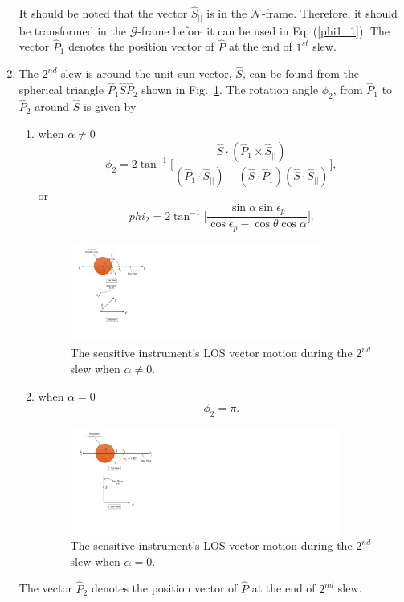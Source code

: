 \documentclass[journal ]{new-aiaa}
\begin{document}
\begin{enumerate}
		It should be noted that the vector $\hat{S}_{||}$ is in the $\mathcal{N}$-frame. Therefore, it should be transformed in the $\mathcal{G}$-frame before it can be used in Eq. (\ref{phi1_1}). The vector $\hat{P}_1$ denotes the position vector of $\hat{P}$ at the end of $1^{st}$ slew.
		\item The $2^{nd}$ slew is around the unit sun vector, $\hat{S}$, can be found from the spherical triangle $\hat{P}_1\hat{S}\hat{P}_2$ shown in Fig.~\ref{sphericaltriangle}. The rotation angle $\phi_2$, from $\hat{P}_1$ to $\hat{P}_2$ around $\hat{S}$ is given by\cite{Wertz2011} 
		\begin{enumerate}
			\item when $\alpha\neq 0$
	\begin{equation}
	\phi_2=2\tan^{-1}\Big[ \frac{\hat{S}\cdot (\hat{P}_1\times\hat{S}_{||})}{(\hat{P}_1\cdot\hat{S}_{||})-(\hat{S}\cdot\hat{P}_1)(\hat{S}\cdot\hat{S}_{||})}\Big], 
	\end{equation}
or
	\begin{equation} 
	phi_2=2\tan^{-1}\Big[ \frac{\sin\alpha \sin\epsilon_p}{\cos\epsilon_p-\cos\theta\cos\alpha}\Big].
	\end{equation}
			\begin{figure}[h!]
				\centering
					\includegraphics[width=3.25in]{./Figures/SVAS_2r_modified}
					\caption{The sensitive instrument's LOS vector motion during the $2^{nd}$ slew when $\alpha\neq 0$.}
					\label{sphericaltriangle}
			\end{figure}			
			\item when $\alpha=0$
			\begin{equation}
				\phi_2 = \pi.
			\end{equation}
			\begin{figure}[h!]
				\centering
					\includegraphics[width=3.5in]{./Figures/SVAS_3r_modified}
						\caption{The sensitive instrument's LOS vector motion during the $2^{nd}$ slew when $\alpha= 0$.}
			\end{figure}
		\end{enumerate}
		The vector $\hat{P}_2$ denotes the position vector of $\hat{P}$ at the end of $2^{nd}$ slew.
		

\end{enumerate}
\end{document}
